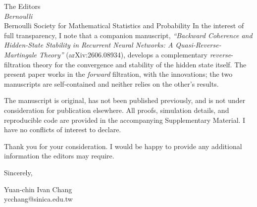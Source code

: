 \documentclass[11pt]{letter}
\begin{document}
\begin{letter}{The Editors\\ \textit{Bernoulli}\\ Bernoulli Society for
  Mathematical Statistics and Probability}
In the interest of full transparency, I note that a companion manuscript,
\textit{``Backward Coherence and Hidden-State Stability in Recurrent Neural
Networks: A Quasi-Reverse-Martingale Theory''} (arXiv:2606.08934), develops a
complementary \emph{reverse}-filtration theory for the convergence and stability
of the hidden state itself. The present paper works in the \emph{forward}
filtration, with the innovations; the two manuscripts are self-contained and
neither relies on the other's results.

The manuscript is original, has not been published previously, and is not under
consideration for publication elsewhere. All proofs, simulation details, and
reproducible code are provided in the accompanying Supplementary Material. I have
no conflicts of interest to declare.

Thank you for your consideration. I would be happy to provide any additional
information the editors may require.

\closing{Sincerely,}
Yuan-chin Ivan Chang\\
ycchang@sinica.edu.tw

\end{letter}
\end{document}
